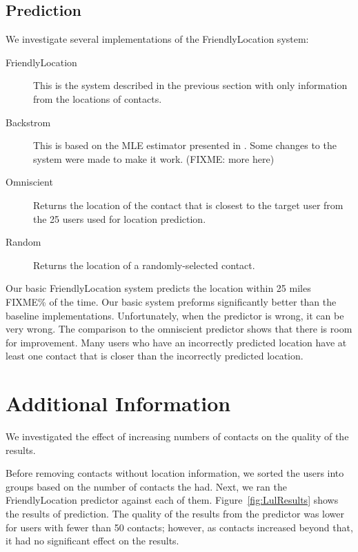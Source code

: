 \subsection{Prediction}
We investigate several implementations of the FriendlyLocation system:
\begin{description}
\item[FriendlyLocation] This is the system described in the previous
    section with only information from the locations of contacts.
\item[Backstrom] This is based on the MLE estimator presented in
    \cite{backstrom2010find}. Some changes to the system were made to make it
    work. (FIXME: more here)
\item[Omniscient] Returns the location of the contact that is closest to the
    target user from the 25 users used for location prediction.
\item[Random] Returns the location of a randomly-selected contact.
\end{description}

Our basic FriendlyLocation system predicts the location within 25 miles FIXME\% of
the time.
%
Our basic system preforms significantly better than the baseline implementations.
%
Unfortunately, when the predictor is wrong, it can be very wrong.
%
The comparison to the omniscient predictor shows that there is room for improvement.
%
Many users who have an incorrectly predicted location have at least one contact
that is closer than the incorrectly predicted location.


\section{Additional Information}
We investigated the effect of increasing numbers of contacts on the quality of
the results.

Before removing contacts without location information, we sorted the users into
groups based on the number of contacts the had.
Next, we ran the FriendlyLocation predictor against each of them.
Figure~\ref{fig:LulResults} shows the results of prediction.
The quality of the results from the predictor was lower for users with fewer
than 50 contacts; however, as contacts increased beyond that, it had no
significant effect on the results.

